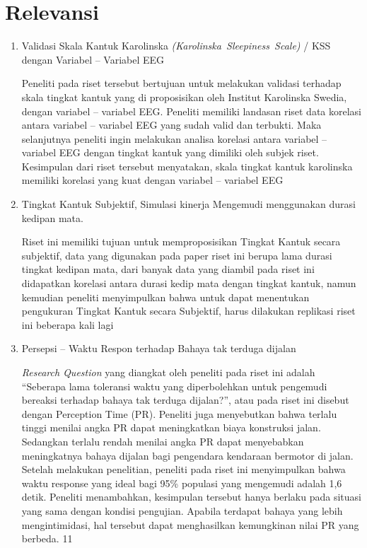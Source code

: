 \section{Relevansi}
\begin{enumerate}
    \item Validasi Skala Kantuk Karolinska \mbox{\textit{(Karolinska Sleepiness Scale)}} / KSS dengan Variabel – Variabel EEG
    \par
    Peneliti pada riset tersebut bertujuan untuk melakukan validasi terhadap skala tingkat kantuk yang di proposisikan oleh Institut Karolinska Swedia, dengan variabel – variabel EEG. Peneliti memiliki landasan riset data korelasi antara variabel – variabel EEG  yang sudah valid dan terbukti. Maka selanjutnya peneliti ingin melakukan analisa korelasi antara variabel – variabel EEG dengan tingkat kantuk yang dimiliki oleh subjek riset. Kesimpulan dari riset tersebut menyatakan, skala tingkat kantuk karolinska memiliki korelasi yang kuat dengan variabel – variabel EEG \cite{cit:6}
    \vspace{1ex}
    
    \item Tingkat Kantuk Subjektif,  Simulasi kinerja Mengemudi menggunakan durasi kedipan mata.
    \par
    Riset ini memiliki tujuan untuk memproposisikan Tingkat Kantuk secara subjektif, data yang digunakan pada paper riset ini berupa lama durasi tingkat kedipan mata, dari banyak data yang diambil pada riset ini didapatkan korelasi antara durasi kedip mata dengan tingkat kantuk, namun kemudian peneliti menyimpulkan bahwa untuk dapat menentukan pengukuran Tingkat Kantuk secara Subjektif, harus dilakukan replikasi riset ini beberapa kali lagi \cite{cit:7}
    \vspace{1ex}
    
    \item Persepsi – Waktu Respon terhadap Bahaya tak terduga dijalan
    \par
    \textit{Research Question} yang diangkat oleh peneliti pada riset ini adalah “Seberapa lama toleransi waktu yang diperbolehkan untuk pengemudi bereaksi terhadap bahaya tak terduga dijalan?”, atau pada riset ini disebut dengan Perception Time (PR). Peneliti juga menyebutkan bahwa terlalu tinggi menilai angka PR dapat meningkatkan biaya konstruksi jalan. Sedangkan terlalu rendah menilai angka PR dapat menyebabkan meningkatnya bahaya dijalan bagi pengendara kendaraan bermotor di jalan. Setelah melakukan penelitian, peneliti pada riset ini menyimpulkan bahwa waktu response yang ideal bagi 95\% populasi yang mengemudi adalah 1,6 detik. Peneliti menambahkan, kesimpulan tersebut hanya berlaku pada situasi yang sama dengan kondisi pengujian. Apabila terdapat bahaya yang lebih mengintimidasi, hal tersebut dapat menghasilkan kemungkinan nilai PR yang berbeda. \cite{cit:8}
    \vspace{1ex}11

\end{enumerate}
\vspace{1ex}